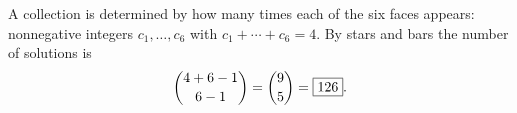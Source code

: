 A collection is determined by how many times each of the six faces appears: nonnegative integers $c_1,\dots,c_6$ with $c_1+\cdots+c_6=4$. By stars and bars the number of solutions is
\[
\dbinom{4+6-1}{6-1}=\dbinom95=\boxed{126}.
\]
